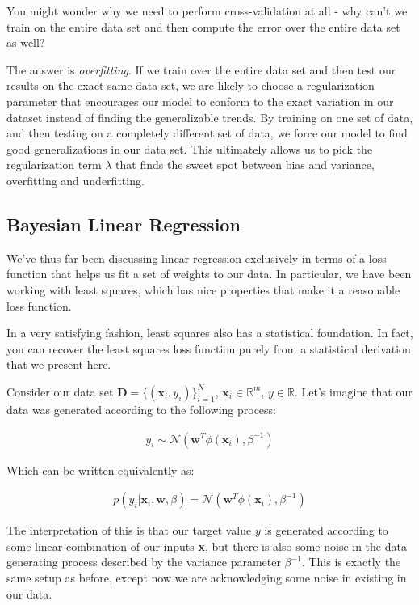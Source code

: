 You might wonder why we need to perform cross-validation at all - why can't we train on the entire data set and then compute the error over the entire data set as well?

The answer is \textit{overfitting}. If we train over the entire data set and then test our results on the exact same data set, we are likely to choose a regularization parameter that encourages our model to conform to the exact variation in our dataset instead of finding the generalizable trends. By training on one set of data, and then testing on a completely different set of data, we force our model to find good generalizations in our data set. This ultimately allows us to pick the regularization term $\lambda$ that finds the sweet spot between bias and variance, overfitting and underfitting.

\subsection{Bayesian Linear Regression}
We've thus far been discussing linear regression exclusively in terms of a loss function that helps us fit a set of weights to our data. In particular, we have been working with least squares, which has nice properties that make it a reasonable loss function.

In a very satisfying fashion, least squares also has a statistical foundation. In fact, you can recover the least squares loss function purely from a statistical derivation that we present here.

Consider our data set $\textbf{D} = \{(\textbf{x}_{i}, y_{i})\}_{i = 1}^{N}$, $\textbf{x}_{i} \in\mathbb{R}^m$, $y \in\mathbb{R}$. Let's imagine that our data was generated according to the following process:

\begin{align*}
    y_{i} \sim \mathcal{N}(\textbf{w}^{T}\phi(\textbf{x}_{i}), \beta^{-1})
\end{align*}

Which can be written equivalently as:

\begin{align*}
    p(y_{i} | \textbf{x}_{i}, \textbf{w}, \beta) = \mathcal{N}(\textbf{w}^{T}\phi(\textbf{x}_{i}), \beta^{-1})
\end{align*}

The interpretation of this is that our target value $y$ is generated according to some linear combination of our inputs \textbf{x}, but there is also some noise in the data generating process described by the variance parameter $\beta^{-1}$. This is exactly the same setup as before, except now we are acknowledging some noise in existing in our data.

